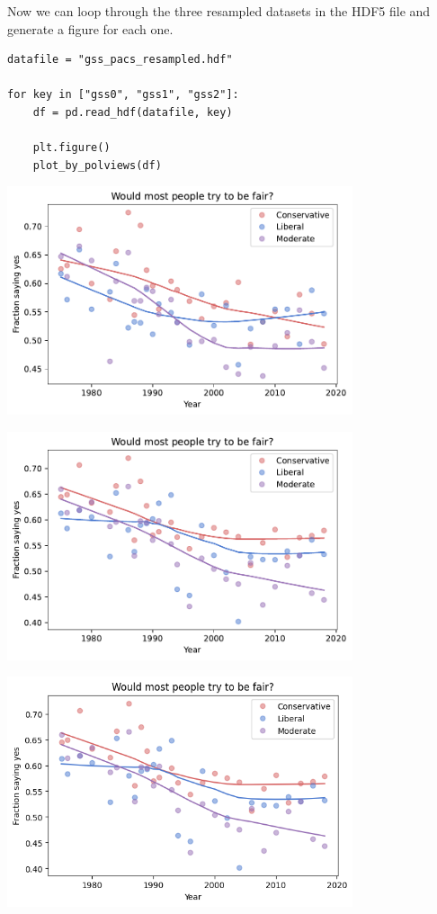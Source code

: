 Now we can loop through the three resampled datasets in the HDF5 file
and generate a figure for each one.

\begin{lstlisting}[]
datafile = "gss_pacs_resampled.hdf"

for key in ["gss0", "gss1", "gss2"]:
    df = pd.read_hdf(datafile, key)

    plt.figure()
    plot_by_polviews(df)
\end{lstlisting}

\begin{center}
\includegraphics[width=4in]{chapters/03_outlook_files/03_outlook_59_0.pdf}
\end{center}

\begin{center}
\includegraphics[width=4in]{chapters/03_outlook_files/03_outlook_59_1.pdf}
\end{center}

\begin{center}
\includegraphics[width=4in]{chapters/03_outlook_files/03_outlook_59_2.png}
\end{center}

